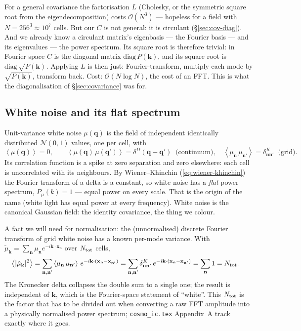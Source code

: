 \documentclass[12pt]{article}
\newcommand{\bk}{\mathbf{k}}
\newcommand{\bx}{\mathbf{x}}
\newcommand{\bn}{\mathbf{n}}
\newcommand{\bq}{\mathbf{q}}
\newcommand{\avg}[1]{\left\langle #1 \right\rangle}
\newcommand{\code}[1]{\texttt{#1}}
\begin{document}
For a general covariance the factorisation $L$ (Cholesky, or the
symmetric square root from the eigendecomposition) costs $\mathcal
O(N^3)$ --- hopeless for a field with $N = 256^3 \approx 10^7$ cells.
But our $C$ is not general: it is circulant (\S\ref{sec:cov-diag}).  And
we already know a circulant matrix's eigenbasis --- the Fourier basis ---
and its eigenvalues --- the power spectrum.  Its square root is therefore
trivial: in Fourier space $C$ is the diagonal matrix
$\mathrm{diag}\,P(\bk)$, and its square root is
$\mathrm{diag}\,\sqrt{P(\bk)}$.  Applying $L$ is then just:
Fourier-transform, multiply each mode by $\sqrt{P(\bk)}$, transform back.
Cost: $\mathcal O(N \log N)$, the cost of an FFT.  This is what the
diagonalisation of \S\ref{sec:covariance} was for.

\subsection{White noise and its flat spectrum}
\label{sec:whitenoise}

Unit-variance white noise $\mu(\bq)$ is the field of independent
identically distributed $\mathcal N(0,1)$ values, one per cell, with
\begin{equation}
  \avg{\mu(\bq)} = 0,
  \qquad
  \avg{\mu(\bq)\,\mu(\bq')} = \delta^D(\bq - \bq')
  \;\;\text{(continuum)},
  \quad
  \avg{\mu_\bn\,\mu_{\bn'}} = \delta^K_{\bn\bn'}
  \;\;\text{(grid)}.
  \label{eq:whitenoise}
\end{equation}
Its correlation function is a spike at zero separation and zero
elsewhere: each cell is uncorrelated with its neighbours.  By
Wiener--Khinchin (\ref{eq:wiener-khinchin}) the Fourier transform of a
delta is a constant, so white noise has a \emph{flat} power spectrum,
$P_\mu(k) = 1$ --- equal power on every scale.  That is the origin of the
name (white light has equal power at every frequency).  White noise is
the canonical Gaussian field: the identity covariance, the thing we
colour.

A fact we will need for normalisation: the (unnormalised) discrete
Fourier transform of grid white noise has a known per-mode variance.
With $\tilde\mu_\bk = \sum_\bn \mu_\bn e^{-i\bk\cdot\bx_\bn}$ over
$N_{\rm tot}$ cells,
\begin{align}
  \avg{|\tilde\mu_\bk|^2}
  &= \sum_{\bn,\bn'} \avg{\mu_\bn\,\mu_{\bn'}}\,
     e^{-i\bk\cdot(\bx_\bn - \bx_{\bn'})}
   = \sum_{\bn,\bn'} \delta^K_{\bn\bn'}\,
     e^{-i\bk\cdot(\bx_\bn - \bx_{\bn'})}
   = \sum_\bn 1 = N_{\rm tot}.
  \label{eq:whitenoise-permode}
\end{align}
The Kronecker delta collapses the double sum to a single one; the result
is independent of $\bk$, which is the Fourier-space statement of
``white''.  This $N_{\rm tot}$ is the factor that has to be divided out
when converting a raw FFT amplitude into a physically normalised power
spectrum; \code{cosmo\_ic.tex} Appendix~A
track exactly where it goes.
\end{document}

